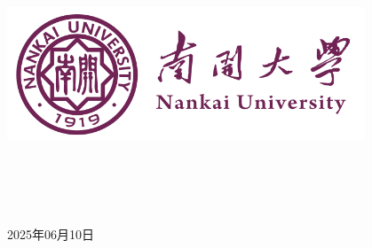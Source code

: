 \documentclass[a4paper]{article}
\begin{document}
\renewcommand{\contentsname}{目\ 录}
\renewcommand{\appendixname}{附录}
\renewcommand{\appendixpagename}{附录}
\renewcommand{\refname}{参考文献}
\renewcommand{\figurename}{图}
\renewcommand{\tablename}{表}

\begin{titlepage}
    \begin{center}
    \includegraphics[width=0.8\textwidth]{fig/NKU.png}\\[1cm]
    \vspace{20mm}
		\textbf{\huge\textbf{}}\\[0.5cm]
		\textbf{\huge{}}\\[2.3cm]
		\textbf{\Huge\textbf{}}

		\vspace{\fill}

    \centering
    \textsc{\LARGE {}}\\[0.5cm]
    \textsc{\LARGE {}}\\[0.5cm]
    
    \vfill
    {\Large 2025年06月10日}
    \end{center}
\end{titlepage}
\end{document}
